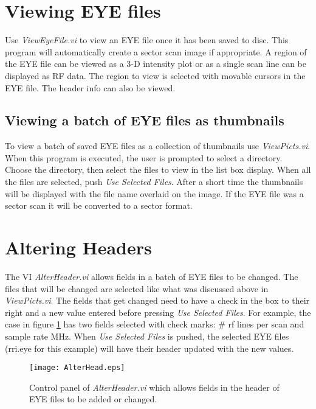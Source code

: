 \documentclass[10pt]{article}
\begin{document}
\section{Viewing EYE files}

Use {\it ViewEyeFile.vi} to view an EYE file once it has been
saved to disc. This program will automatically create a sector
scan image if appropriate. A region of the EYE file can be viewed
as a 3-D intensity plot or as a single scan line can be displayed
as RF data. The region to view is selected with movable cursors in
the EYE file. The header info can also be viewed.

\subsection{Viewing a batch of EYE files as thumbnails}

To view a batch of saved EYE files as a collection of thumbnails
use {\it ViewPicts.vi}. When this program is executed, the user is
prompted to select a directory. Choose the directory, then select
the files to view in the list box display. When all the files are
selected, push {\it Use Selected Files}. After a short time the
thumbnails will be displayed with the file name overlaid on the
image. If the EYE file was a sector scan it will be converted to a
sector format.


\section{Altering Headers}

The VI {\it AlterHeader.vi} allows fields in a batch of EYE files
to be changed. The files that will be changed are selected like
what was discussed above in {\it ViewPicts.vi}. The fields that
get changed need to have a check in the box to their right and a
new value entered before pressing {\it Use Selected Files}. For
example, the case in figure \ref{fig:AltHead} has two fields
selected with check marks: \# rf lines per scan and sample rate
MHz. When {\it Use Selected Files} is pushed, the selected EYE
files (rri.eye for this example) will have their header updated
with the new values.


\begin{figure}[!htb]
\begin{center}
\texttt{[image: AlterHead.eps]}
 \caption{Control panel of {\it AlterHeader.vi} which allows
 fields in the header of EYE files to be added or changed.}
 \label{fig:AltHead}
\end{center}
\end{figure}
\end{document}
